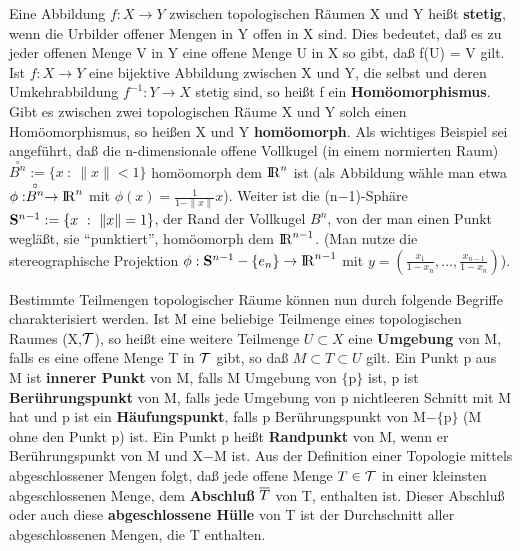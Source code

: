 Eine Abbildung $f:X\to Y$ zwischen topologischen Räumen X und Y heißt
{\bf stetig}, wenn die Urbilder offener Mengen in Y offen in X sind.
Dies bedeutet, daß es zu jeder offenen Menge V in Y eine offene Menge U in X
so gibt, daß f(U) = V gilt.
Ist $f:X\to Y$ eine bijektive Abbildung zwischen X und Y, die selbst
und deren Umkehrabbildung $f^{-1}:Y\to X$ stetig sind, so heißt f ein
{\bf Homöomorphismus}. Gibt es zwischen zwei
topologischen Räume X und Y solch einen Homöomorphismus, so heißen X und Y
{\bf homöomorph}.
Als wichtiges Beispiel sei angeführt, daß die n-dimensionale offene Vollkugel
(in einem normierten Raum) $\stackrel{\circ}{B^n} := \{x~:~\|x\|< 1\}$
homöomorph dem $\R^n$ ist (als Abbildung wähle man etwa
$\phi:\stackrel{\circ}{B^n}\to\R^n$ mit $\phi(x)=\frac{1}{1-\|x\|}x$). Weiter
ist die (n$-$1)-Sphäre $\S^{n-1}:=\{x~:~\|x\|=1\}$, der Rand der Vollkugel
$B^n$, von der man einen Punkt wegläßt, sie "`punktiert"', homöomorph dem
$\R^{n-1}$. (Man nutze die stereographische Projektion
$\phi:\S^{n-1}-\{e_n\}\to\R^{n-1}$ mit
$y=(\frac{x_1}{1-x_n},\ldots,\frac{x_{n-1}}{1-x_n})$).

Bestimmte Teilmengen topologischer Räume können nun durch folgende Begriffe
charakterisiert werden. Ist M eine beliebige Teilmenge eines
topologischen Raumes (X,$\T$), so heißt eine weitere Teilmenge $U\subset X$
eine {\bf Umgebung} von M, falls es eine offene Menge T in $\T$
gibt, so daß $M\subset T\subset U$ gilt.
Ein Punkt p aus M ist {\bf innerer Punkt} von M, falls M
Umgebung von  $\{$p$\}$ ist, p ist {\bf Berührungspunkt}
von M, falls jede Umgebung von p nichtleeren Schnitt mit M hat und p ist ein
{\bf Häufungspunkt}, falls p Berührungspunkt von
M$-\{$p$\}$ (M ohne den Punkt p) ist. Ein Punkt p heißt {\bf Randpunkt}
 von M, wenn er Berührungspunkt von M und X$-$M ist.
Aus der Definition einer Topologie mittels abgeschlossener Mengen
folgt, daß jede offene Menge $T\in\T$ in einer kleinsten abgeschlossenen
Menge, dem {\bf Abschluß} $\ol{T}$ von T, enthalten ist. Dieser
Abschluß oder auch diese {\bf abgeschlossene Hülle} von T ist der Durchschnitt
aller abgeschlossenen Mengen, die T enthalten.

